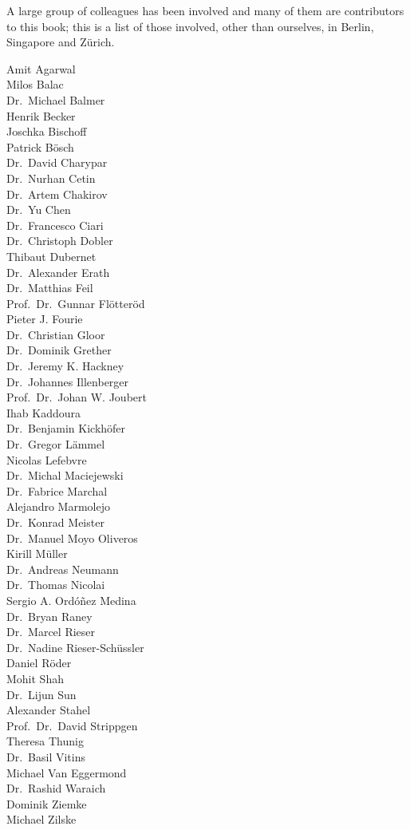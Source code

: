 A large group of colleagues has been involved and many of them are contributors to this book; this is a list of those involved, other than ourselves,
in Berlin, Singapore and Zürich.  
%
\begin{multicols}{3}
Amit Agarwal \\
Milos Balac  \\
Dr.~Michael Balmer \\
Henrik Becker \\
Joschka Bischoff \\
Patrick Bösch \\
Dr.~David Charypar \\
Dr.~Nurhan Cetin  \\
Dr.~Artem Chakirov \\
Dr.~Yu Chen \\
Dr.~Francesco Ciari \\
Dr.~Christoph Dobler \\
Thibaut Dubernet\\
Dr.~Alexander Erath \\
Dr.~Matthias Feil \\
Prof.~Dr.~Gunnar Flötteröd \\
Pieter J. Fourie\\
Dr.~Christian Gloor \\
Dr.~Dominik Grether \\
Dr.~Jeremy K. Hackney \\
Dr.~Johannes Illenberger \\
Prof.~Dr.~Johan W. Joubert\\
Ihab Kaddoura \\
Dr.~Benjamin Kickhöfer \\
Dr.~Gregor Lämmel\\
Nicolas Lefebvre \\
Dr.~Michal Maciejewski \\
Dr.~Fabrice Marchal \\
Alejandro Marmolejo \\
Dr.~Konrad Meister \\
Dr.~Manuel Moyo Oliveros \\
Kirill Müller \\
Dr.~Andreas Neumann \\
Dr.~Thomas Nicolai \\
Sergio A. Ordóñez Medina \\
Dr.~Bryan Raney \\
Dr.~Marcel Rieser\\
Dr.~Nadine Rieser-Schüssler \\
Daniel Röder \\
Mohit Shah \\
Dr.~Lijun Sun \\
Alexander Stahel \\
Prof.~Dr.~David Strippgen \\
Theresa Thunig \\
Dr.~Basil Vitins \\
Michael Van Eggermond \\
Dr.~Rashid Waraich\\
Dominik Ziemke \\
Michael Zilske\\
\end{multicols}
